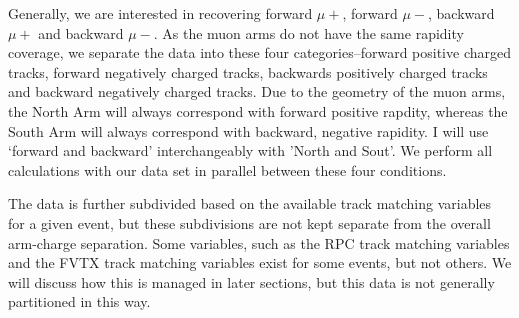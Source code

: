 Generally, we are interested in recovering forward $\mu+$, forward $\mu-$,
backward $\mu+$ and backward $\mu-$. As the muon arms do not have the same
rapidity coverage, we separate the data into these four categories--forward
positive charged tracks, forward negatively charged tracks, backwards positively
charged tracks and backward negatively charged tracks. Due to the geometry of
the muon arms, the North Arm will always correspond with forward positive
rapdity, whereas the South Arm will always correspond with backward, negative
rapidity. I will use `forward and backward' interchangeably with 'North and
Sout'. We perform all calculations with our data set in parallel between these
four conditions.

The data is further subdivided based on the available track matching variables
for a given event, but these subdivisions are not kept separate from the
overall arm-charge separation. Some variables, such as the RPC track matching
variables and the FVTX track matching variables exist for some events, but not
others. We will discuss how this is managed in later sections, but this data is
not generally partitioned in this way.

\clearpage
